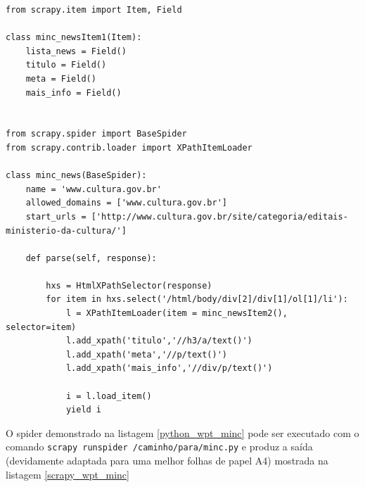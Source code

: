 \pagebreak
{}
\begin{lstlisting}[label=python_wpt_minc]
from scrapy.item import Item, Field

class minc_newsItem1(Item):
    lista_news = Field()
    titulo = Field()
    meta = Field()
    mais_info = Field()


from scrapy.spider import BaseSpider
from scrapy.contrib.loader import XPathItemLoader

class minc_news(BaseSpider):
    name = 'www.cultura.gov.br'
    allowed_domains = ['www.cultura.gov.br']
    start_urls = ['http://www.cultura.gov.br/site/categoria/editais-ministerio-da-cultura/']

    def parse(self, response):
        
        hxs = HtmlXPathSelector(response)
        for item in hxs.select('/html/body/div[2]/div[1]/ol[1]/li'):
            l = XPathItemLoader(item = minc_newsItem2(), selector=item)
            l.add_xpath('titulo','//h3/a/text()')
            l.add_xpath('meta','//p/text()')
            l.add_xpath('mais_info','//div/p/text()')

            i = l.load_item()
            yield i

\end{lstlisting}


O spider demonstrado na listagem \ref{python_wpt_minc} pode ser executado com o comando \texttt{scrapy runspider /caminho/para/minc.py} e produz a saída (devidamente adaptada para uma melhor folhas de papel A4) mostrada na listagem \ref{scrapy_wpt_minc}


